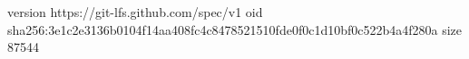 version https://git-lfs.github.com/spec/v1
oid sha256:3e1c2e3136b0104f14aa408fc4c8478521510fde0f0c1d10bf0c522b4a4f280a
size 87544
